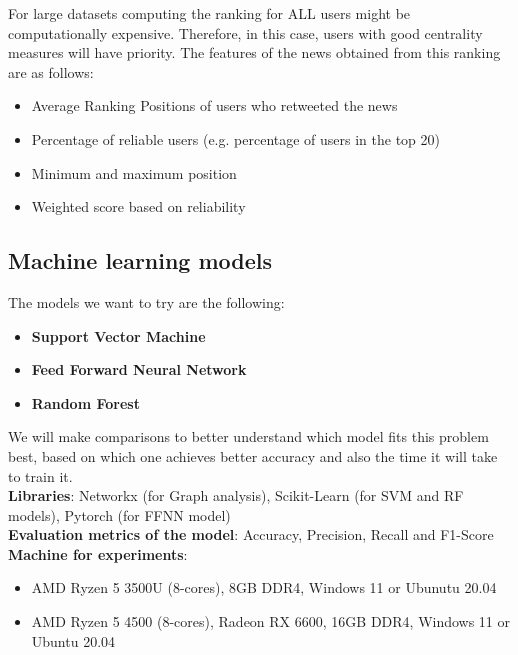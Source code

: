 \documentclass[11pt,a4paper]{article}
\begin{document}
For large datasets computing the ranking for ALL users might be computationally expensive. Therefore, in this case, users with good centrality measures will have priority. 
The features of the news obtained from this ranking are as follows:
\begin{itemize}
	\setlength\itemsep{-0.3em}
	\item Average Ranking Positions of users who retweeted the news
	\item Percentage of reliable users (e.g. percentage of users in the top 20)
	\item Minimum and maximum position
	\item Weighted score based on reliability
\end{itemize}

\subsection*{Machine learning models}

The models we want to try are the following:
\begin{itemize}
	\setlength\itemsep{-0.3em}
	\item \textbf{Support Vector Machine}
	\item \textbf{Feed Forward Neural Network}
	\item \textbf{Random Forest}
\end{itemize}

We will make comparisons to better understand which model fits this problem best, based on which one achieves better accuracy and also the time it will take to train it.
\\\textbf{Libraries}: Networkx (for Graph analysis), Scikit-Learn (for SVM and RF models), Pytorch (for FFNN model)
\\\textbf{Evaluation metrics of the model}: Accuracy, Precision, Recall and F1-Score
\\\textbf{Machine for experiments}: 
\begin{itemize}
	\setlength\itemsep{-0.3em}
	\item AMD Ryzen 5 3500U (8-cores), 8GB DDR4, Windows 11 or Ubunutu 20.04
	\item AMD Ryzen 5 4500 (8-cores), Radeon RX 6600, 16GB DDR4, Windows 11 or Ubuntu 20.04
\end{itemize}

\newpage
\end{document}
